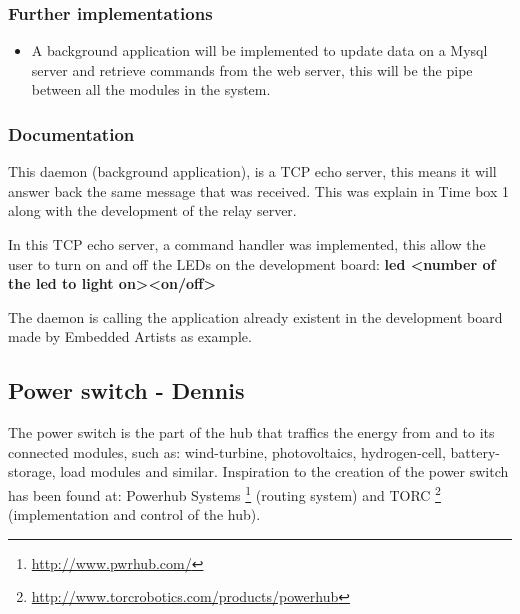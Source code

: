 \subsubsection{Further implementations}
\begin{itemize}
	\item A background application will be implemented to update data on a Mysql server and retrieve commands from the web server, this will be the pipe between all the modules in the system.
\end{itemize}


\subsubsection{Documentation}
This daemon (background application), is a TCP echo server, this means it will answer back the same message that was received. This was explain in Time box 1 along with the development of the relay server. 

In this TCP echo server, a command handler was implemented, this allow the user to turn on and off the LEDs on the development board: \textbf{led \textless number of the led to light on\textgreater  \textless on/off\textgreater}

The daemon is calling the application already existent in the development board made by Embedded Artists as example.

\subsection{Power switch - Dennis}
The power switch is the part of the hub that traffics the energy from and to its connected modules, such as: wind-turbine, photovoltaics, hydrogen-cell, battery-storage, load modules and similar. Inspiration to the creation of the power switch has been found at: Powerhub Systems \footnote{\url{http://www.pwrhub.com/}} (routing system) and TORC \footnote{\url{http://www.torcrobotics.com/products/powerhub}} (implementation and control of the hub).
